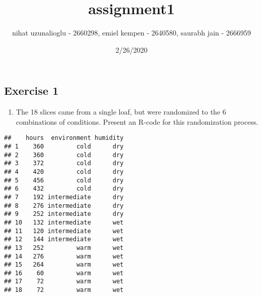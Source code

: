 \documentclass[]{article}
\title{assignment1}
\author{nihat uzunalioglu - 2660298, emiel kempen - 2640580, saurabh jain -
2666959}
\date{2/26/2020}
\newenvironment{Shaded}{\begin{snugshade}}{\end{snugshade}}
\newcommand{\CommentTok}[1]{\textcolor[rgb]{0.56,0.35,0.01}{\textit{#1}}}
\newcommand{\DataTypeTok}[1]{\textcolor[rgb]{0.13,0.29,0.53}{#1}}
\newcommand{\DecValTok}[1]{\textcolor[rgb]{0.00,0.00,0.81}{#1}}
\newcommand{\KeywordTok}[1]{\textcolor[rgb]{0.13,0.29,0.53}{\textbf{#1}}}
\newcommand{\NormalTok}[1]{#1}
\newcommand{\OperatorTok}[1]{\textcolor[rgb]{0.81,0.36,0.00}{\textbf{#1}}}
\newcommand{\StringTok}[1]{\textcolor[rgb]{0.31,0.60,0.02}{#1}}
\providecommand{\tightlist}{%
  \setlength{\itemsep}{0pt}\setlength{\parskip}{0pt}}
\begin{document}
\maketitle

\hypertarget{exercise-1}{%
\subsection{Exercise 1}\label{exercise-1}}

\begin{enumerate}
\def\labelenumi{\alph{enumi})}
\tightlist
\item
  The 18 slices came from a single loaf, but were randomized to the 6
  combinations of conditions. Present an R-code for this randomization
  process.
\end{enumerate}

\begin{Shaded}
\end{Shaded}

\begin{verbatim}
##    hours  environment humidity
## 1    360         cold      dry
## 2    360         cold      dry
## 3    372         cold      dry
## 4    420         cold      dry
## 5    456         cold      dry
## 6    432         cold      dry
## 7    192 intermediate      dry
## 8    276 intermediate      dry
## 9    252 intermediate      dry
## 10   132 intermediate      wet
## 11   120 intermediate      wet
## 12   144 intermediate      wet
## 13   252         warm      wet
## 14   276         warm      wet
## 15   264         warm      wet
## 16    60         warm      wet
## 17    72         warm      wet
## 18    72         warm      wet
\end{verbatim}
\end{document}
